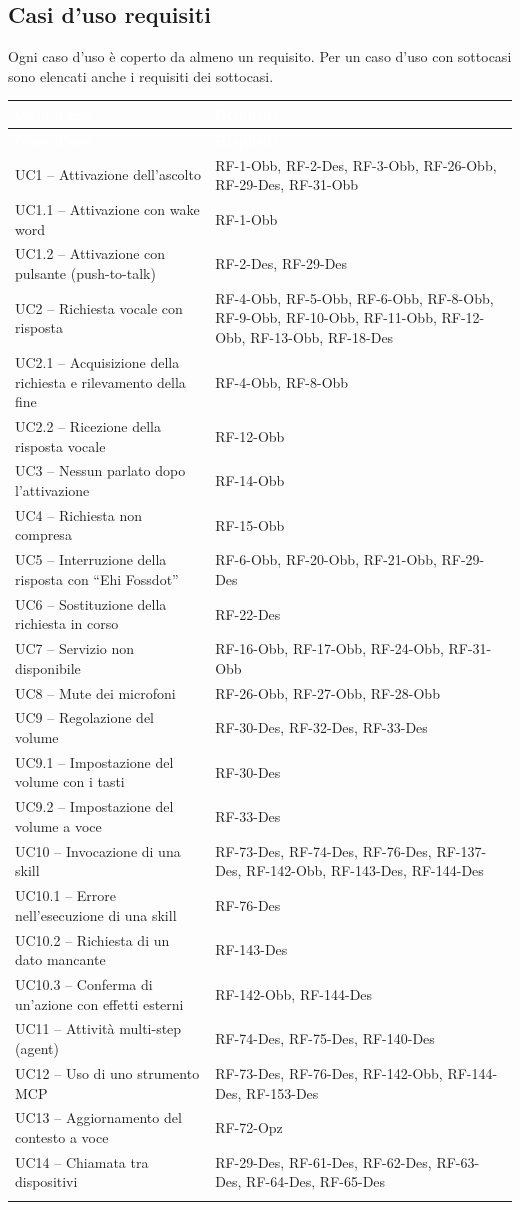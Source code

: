 \documentclass[12pt,a4paper]{article}
\newcommand{\thc}[1]{\textcolor{white}{\textbf{#1}}}
\newcommand{\rl}{\\ \arrayrulecolor{bfline}\hline}
\begin{document}
\subsection{Casi d'uso \textrightarrow{} requisiti}

Ogni caso d'uso è coperto da almeno un requisito. Per un caso d'uso con sottocasi sono elencati anche i requisiti dei sottocasi.


\begin{longtable}{>{\raggedright\arraybackslash}p{}>{\raggedright\arraybackslash}p{}}
\rowcolor{bfblue}\thc{Caso d'uso} & \thc{Requisiti} \\
\endfirsthead
\rowcolor{bfblue}\thc{Caso d'uso} & \thc{Requisiti} \\
\endhead
UC1 -- Attivazione dell'ascolto & RF-1-Obb, RF-2-Des, RF-3-Obb, RF-26-Obb, RF-29-Des, RF-31-Obb \rl
UC1.1 -- Attivazione con wake word & RF-1-Obb \rl
UC1.2 -- Attivazione con pulsante (push-to-talk) & RF-2-Des, RF-29-Des \rl
UC2 -- Richiesta vocale con risposta & RF-4-Obb, RF-5-Obb, RF-6-Obb, RF-8-Obb, RF-9-Obb, RF-10-Obb, RF-11-Obb, RF-12-Obb, RF-13-Obb, RF-18-Des \rl
UC2.1 -- Acquisizione della richiesta e rilevamento della fine & RF-4-Obb, RF-8-Obb \rl
UC2.2 -- Ricezione della risposta vocale & RF-12-Obb \rl
UC3 -- Nessun parlato dopo l'attivazione & RF-14-Obb \rl
UC4 -- Richiesta non compresa & RF-15-Obb \rl
UC5 -- Interruzione della risposta con ``Ehi Fossdot'' & RF-6-Obb, RF-20-Obb, RF-21-Obb, RF-29-Des \rl
UC6 -- Sostituzione della richiesta in corso & RF-22-Des \rl
UC7 -- Servizio non disponibile & RF-16-Obb, RF-17-Obb, RF-24-Obb, RF-31-Obb \rl
UC8 -- Mute dei microfoni & RF-26-Obb, RF-27-Obb, RF-28-Obb \rl
UC9 -- Regolazione del volume & RF-30-Des, RF-32-Des, RF-33-Des \rl
UC9.1 -- Impostazione del volume con i tasti & RF-30-Des \rl
UC9.2 -- Impostazione del volume a voce & RF-33-Des \rl
UC10 -- Invocazione di una skill & RF-73-Des, RF-74-Des, RF-76-Des, RF-137-Des, RF-142-Obb, RF-143-Des, RF-144-Des \rl
UC10.1 -- Errore nell'esecuzione di una skill & RF-76-Des \rl
UC10.2 -- Richiesta di un dato mancante & RF-143-Des \rl
UC10.3 -- Conferma di un'azione con effetti esterni & RF-142-Obb, RF-144-Des \rl
UC11 -- Attività multi-step (agent) & RF-74-Des, RF-75-Des, RF-140-Des \rl
UC12 -- Uso di uno strumento MCP & RF-73-Des, RF-76-Des, RF-142-Obb, RF-144-Des, RF-153-Des \rl
UC13 -- Aggiornamento del contesto a voce & RF-72-Opz \rl
UC14 -- Chiamata tra dispositivi & RF-29-Des, RF-61-Des, RF-62-Des, RF-63-Des, RF-64-Des, RF-65-Des \rl

\end{longtable}
\end{document}
